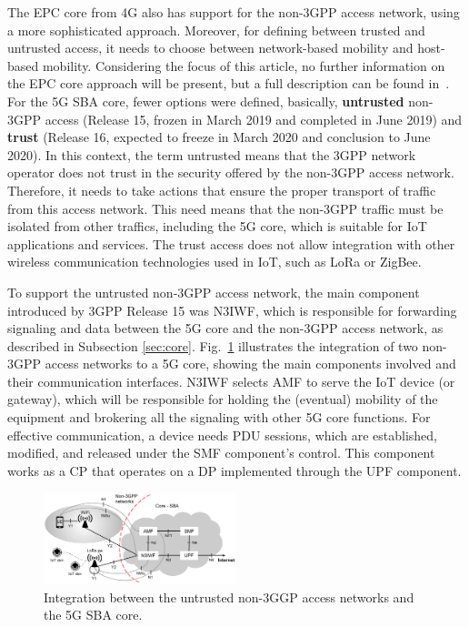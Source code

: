 The EPC core from 4G also has support for the non-3GPP access network, using a more sophisticated approach. Moreover, for defining between trusted and untrusted access, it needs to choose between network-based mobility and host-based mobility. Considering the focus of this article, no further information on the EPC core approach will be present, but a full description can be found in~\cite{olsson:13}. For the 5G SBA core, fewer options were defined, basically, \textbf{untrusted} non-3GPP access (Release 15, frozen in March 2019 and completed in June 2019) and \textbf{trust} (Release 16, expected to freeze in March 2020 and conclusion to June 2020). In this context, the term untrusted means that the 3GPP network operator does not trust in the security offered by the non-3GPP access network. Therefore, it needs to take actions that ensure the proper transport of traffic from this access network. This need means that the non-3GPP traffic must be isolated from other traffics, including the 5G core, which is suitable for IoT applications and services. The trust access does not allow integration with other wireless communication technologies used in IoT, such as LoRa or ZigBee.

To support the untrusted non-3GPP access network, the main component introduced by 3GPP Release 15 was N3IWF, which is responsible for forwarding signaling and data between the 5G core and the non-3GPP access network, as described in Subsection \ref{sec:core}. Fig.~\ref{fig:non3gpp_untrusted} illustrates the integration of two non-3GPP access networks to a 5G core, showing the main components involved and their communication interfaces. N3IWF selects AMF to serve the IoT device (or gateway), which will be responsible for holding the (eventual) mobility of the equipment and brokering all the signaling with other 5G core functions. For effective communication, a device needs PDU sessions, which are established, modified, and released under the SMF component's control. This component works as a CP that operates on a DP implemented through the UPF component.

\begin{figure}[htb]
 \begin{center}
\includegraphics[width=0.5\textwidth]{figs/non3GPP_untrusted.pdf}
  \end{center}
\caption{Integration between the untrusted non-3GGP access networks and the 5G SBA core.}
\label{fig:non3gpp_untrusted}
\end{figure}

